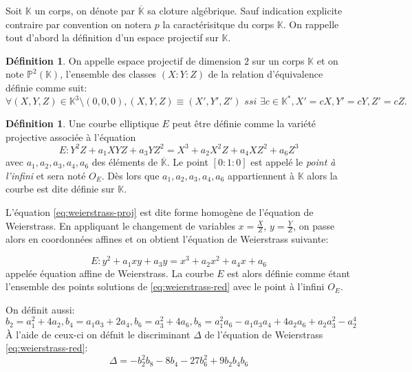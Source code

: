 \documentclass[10pt,a4paper]{book}
\theoremstyle{plain}
\theoremstyle{definition}
\theoremstyle{definition}
\theoremstyle{definition}
\theoremstyle{definition}
\newtheorem{defi}[thm]{Définition}
\theoremstyle{remark}
\theoremstyle{remark}
\begin{document}
Soit $\mathbb{K}$ un corps, on dénote par $\overline{\mathbb{K}}$ sa cloture algébrique. Sauf indication explicite contraire par convention on notera $p$ la caractérisitque du corps $\mathbb{K}$. On rappelle tout d'abord  la définition d'un espace projectif sur $\mathbb{K}$.

\begin{defi}
On appelle espace projectif de dimension $2$ sur un corps $\mathbb{K}$ et on note $\mathbb{P}^2(\mathbb{K})$, l'ensemble des classes $(X:Y:Z)$ de la relation d'équivalence définie comme suit:
\begin{equation*}
\forall (X,Y,Z) \in \mathbb{K}^3 \setminus (0,0,0), (X,Y,Z) \equiv (X',Y',Z') \textit{ ssi }\exists c \in \mathbb{K}^*, X'=cX, Y'=cY, Z'=cZ.
\end{equation*}
\end{defi}

\begin{defi}
Une courbe elliptique $E$ peut être définie comme la variété projective associée à l'équation
\begin{equation}
\label{eq:weierstrass-proj}
E:Y^2Z+a_1XYZ+a_3YZ^2=X^3+a_2X^2Z+a_4XZ^2+a_6Z^3
\end{equation}
avec $a_1,a_2,a_3,a_4,a_6$ des éléments de $\overline{\mathbb{K}}$. Le point $[0:1:0]$ est appelé le \emph{point à l'infini} et sera noté $O_E$. Dès lors que $a_1,a_2,a_3,a_4,a_6$ appartiennent à $\mathbb{K}$ alors la courbe est dite définie sur $\mathbb{K}$.
\end{defi}

L'équation \eqref{eq:weierstrass-proj} est dite forme homogène de l'équation de Weierstrass. En appliquant le changement de variables $x=\frac{X}{Z}$, $y=\frac{Y}{Z}$, on passe alors en coordonnées affines et on obtient l'équation de Weierstrass suivante:

\begin{equation}
\label{eq:weierstrass-red}
E:y^2+a_1xy+a_3y=x^3+a_2x^2+a_4x+a_6
\end{equation}
appelée équation affine de Weierstrass. La courbe $E$ est alors définie comme étant l'ensemble des points solutions de \eqref{eq:weierstrass-red} avec le point à l'infini $O_E$.

 On définit aussi:
\begin{equation*}
b_2=a_1^2+4a_2, b_4=a_1a_3+2a_4, b_6=a_3^2+4a_6, b_8=a_1^2a_6-a_1a_3a_4+4a_2a_6+a_2a_3^2-a_2^4
\end{equation*}
\`A l'aide de ceux-ci on défnit le discriminant $\Delta$ de l'équation de Weierstrass \eqref{eq:weierstrass-red}:
\begin{equation*}
\Delta = -b_2^2b_8-8b_4-27b_6^2+9b_2b_4b_6
\end{equation*}
\end{document}

